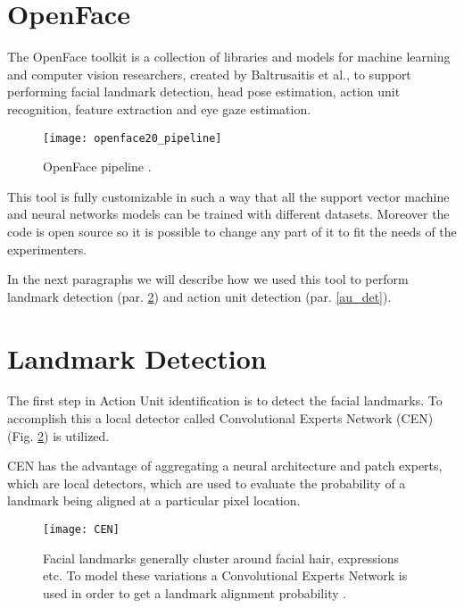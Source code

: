 \section{OpenFace} \label{OpenFace}
The OpenFace \cite{Baltru2018} toolkit is a collection of libraries and models for machine learning and computer vision researchers, created by Baltrusaitis et al., to support performing facial landmark detection, head pose estimation, action unit recognition, feature extraction and eye gaze estimation. 

\begin{figure}[H]
	\centering
	\texttt{[image: openface20\_pipeline]}
	\caption{OpenFace pipeline \cite{Baltru2018}.}
	\label{fig:openface20_pipeline}
\end{figure}

This tool is fully customizable in such a way that all the support vector machine and neural networks models can be trained with different datasets. Moreover the code is open source so it is possible to change any part of it to fit the needs of the experimenters.

In the next paragraphs we will describe how we used this tool to perform landmark detection (par. \ref{landmark_det}) and action unit detection (par. \ref{au_det}).


\clearpage

\section{Landmark Detection} \label{landmark_det}

The first step in Action Unit identification is to detect the facial landmarks. To accomplish this a local detector called Convolutional Experts Network (CEN) (Fig. \ref{fig:CEN}) is utilized.

CEN has the advantage of aggregating a neural architecture and patch experts, which are local detectors, which are used to evaluate the probability of a landmark being aligned at a particular pixel location. 

\begin{figure}[H]
	\centering
	\texttt{[image: CEN]}
	\caption{Facial landmarks generally cluster around facial hair, expressions etc. To model these variations a Convolutional Experts Network is used in order to get a landmark alignment probability \cite{Baltru2017}.}
	\label{fig:CEN}
\end{figure}


